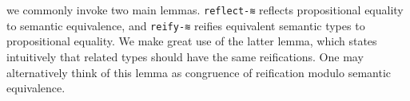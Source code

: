 \documentclass[authoryear, acmsmall, screen, review, nonacm]{acmart}
\begin{document}
\begin{code}[hide]
\AgdaSymbol{(}\AgdaSpace{}%
\AgdaSymbol{(}\AgdaSpace{}%
\AgdaOperator{\AgdaInductiveConstructor{,}}\AgdaSpace{}%
\AgdaSymbol{))\}}\AgdaSpace{}%
\AgdaSymbol{(}\AgdaSpace{}%
\AgdaOperator{\AgdaInductiveConstructor{,}}\AgdaSpace{}%
\AgdaSymbol{)}\AgdaSpace{}%
\AgdaSymbol{(}\AgdaSpace{}%
\AgdaOperator{\AgdaInductiveConstructor{,}}\AgdaSpace{}%
\AgdaSymbol{)}\AgdaSpace{}%
\AgdaSymbol{=}\AgdaSpace{}%
\AgdaSpace{}%
\AgdaOperator{\AgdaInductiveConstructor{,}}\AgdaSpace{}%
\AgdaSymbol{(}\AgdaSpace{}%
\AgdaSpace{}%
\AgdaSymbol{)}\<%
\end{code}

we commonly invoke two main lemmas. \verb!reflect-≋! reflects
propositional equality to semantic equivalence, and \verb!reify-≋! reifies
equivalent semantic types to propositional equality. We make great use of the latter
lemma, which states intuitively that related types should have the same
reifications. One may alternatively think of this lemma as congruence of
reification modulo semantic equivalence.

\begin{code}%
\>[0]%
\>[11]\AgdaSymbol{:}\AgdaSpace{}%
\AgdaSpace{}%
\AgdaSymbol{\{}\AgdaSpace{}%
\AgdaSpace{}%
\AgdaSymbol{:}\AgdaSpace{}%
\AgdaSpace{}%
\AgdaSpace{}%
\AgdaMissingDefinition{\AgdaSymbol{\}}}\AgdaSpace{}%
\AgdaSpace{}%
\AgdaSpace{}%
\AgdaSpace{}%
\AgdaSpace{}%
\AgdaSpace{}%
\AgdaSpace{}%
\AgdaSpace{}%
\AgdaSpace{}%
\AgdaSpace{}%
\<%
\\
\>[0]%
\>[11]\AgdaSymbol{:}\AgdaSpace{}%
\AgdaSpace{}%
\AgdaSymbol{\{}\AgdaSpace{}%
\AgdaSpace{}%
\AgdaSymbol{:}\AgdaSpace{}%
\AgdaSpace{}%
\AgdaSpace{}%
\AgdaSymbol{\}}%
\>[41]\AgdaSpace{}%
\AgdaSpace{}%
\AgdaSpace{}%
\AgdaSpace{}%
\AgdaSpace{}%
\AgdaSpace{}%
%
\>[64]\AgdaSpace{}%
\AgdaSpace{}%
\<%
\end{code}
\end{document}
